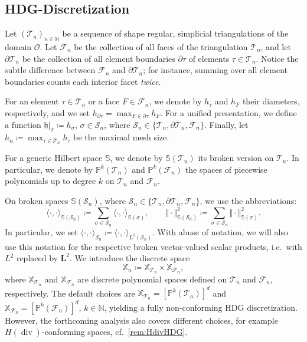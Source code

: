 \documentclass{m2an}
\newcommand{\dom}{\mathcal{O}} %
\renewcommand{\div}{\operatorname{div}}
\newcommand{\calT}{\mathcal{T}}
\newcommand{\X}{\mathbb{X}}
\newcommand{\Xn}{\mathbb{X}_n}
\newcommand{\XT}{\X_{\mathcal{T}_n}}
\newcommand{\XF}{\X_{\mathcal{F}_n}}
\newcommand{\bL}{\mathbf{L}}
\newcommand{\Tn}{\calT_n}
\newcommand{\seq}[1]{(#1_n)_{n \in \mathbb{N}}}
\newcommand{\spl}{\langle}
\newcommand{\spr}{\rangle}
\newcommand{\Fn}{\mathcal{F}_n}
\newcommand{\Sn}{\mathcal{S}_n}
\newcommand{\h}{\mathfrak{h}}
\theoremstyle{plain}
\theoremstyle{definition}
\begin{document}
\subsection{HDG-Discretization}\label{subsec:method:discretization}
Let $\seq{\mathcal{T}}$ be a sequence of shape regular, simplicial triangulations of the domain $\dom$.
Let $\mathcal{F}_n$ be the collection of all faces of the triangulation $\Tn$, and let $\partial \Tn$ be the collection of all element boundaries $\partial \tau$ of elements $\tau \in \Tn$. Notice the subtle difference between $\Fn$ and $\partial \Tn$; for instance, summing over all element boundaries counts each interior facet \emph{twice}.

For an element $\tau \in \Tn$ or a face $F \in \Fn$, we denote by $h_{\tau}$ and $h_{F}$ their diameters, respectively, and we set $h_{\partial \tau} = \max_{F \in \partial \tau} h_F$. For a unified presentation, we define a function $\h \vert_{\sigma} \coloneqq h_{\sigma}$, $\sigma \in \Sn$, where $\Sn \in \{ \Tn, \partial \Tn, \Fn \}$. Finally, let $h_n \coloneqq \max_{\tau \in \Tn} h_{\tau}$ be the maximal mesh size.

For a generic Hilbert space $\mathbb{S}$, we denote by $\mathbb{S}(\Tn)$ its broken version on $\Tn$. In particular, we denote by $\mathbb{P}^k(\Tn)$ and $\mathbb{P}^k(\Fn)$ the spaces of piecewise polynomials up to degree $k$ on $\Tn$ and $\Fn$.

On broken spaces $\mathbb{S}(\Sn)$, where $\Sn \in \{ \Tn, \partial \Tn, \Fn \}$, we use the abbreviations:
\begin{equation*}
   \spl \cdot, \cdot \spr_{\mathbb{S}(\Sn)} \coloneqq \sum_{\sigma \in \Sn} \spl \cdot, \cdot  \spr_{\mathbb{S}(\sigma)}, \qquad \Vert \cdot \Vert_{\mathbb{S}(\Sn)}^2 \coloneqq \sum_{\sigma \in \Sn} \Vert \cdot \Vert_{\mathbb{S}(\sigma)}^2.
\end{equation*}
In particular, we set $\spl \cdot, \cdot \spr_{\Sn} \coloneqq \spl \cdot, \cdot \spr_{L^2(\Sn)}$. With abuse of notation, we will also use this notation for the respective broken vector-valued scalar products, i.e.~with $L^2$ replaced by $\bL^2$. We introduce the discrete space   
\begin{equation*}
   \Xn \coloneqq \XT \times \XF,
\end{equation*} 
where $\XT$ and $\XF$ are discrete polynomial spaces defined on $\Tn$ and $\Fn$, respectively. The default choices are $\XT = [\mathbb{P}^k(\Tn)]^d$ and $\XF = [\mathbb{P}^k(\Fn)]^d$, $k \in \mathbb{N}$, yielding a fully non-conforming HDG discretization. However, the forthcoming analysis also covers different choices, for example $H(\div)$-conforming spaces, cf.~\cref{rem:HdivHDG}.
\end{document}
